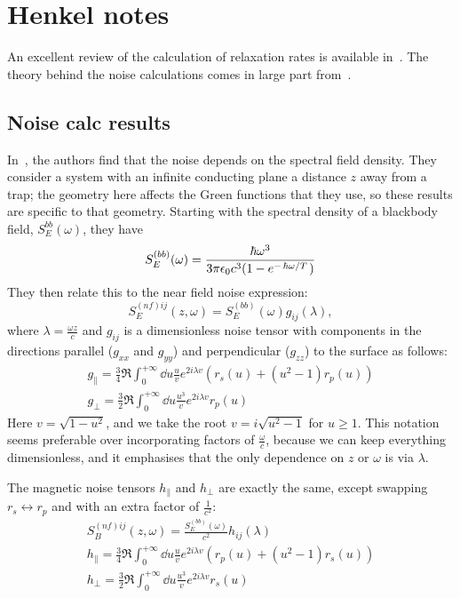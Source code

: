 \documentclass[11pt]{article}
\begin{document}

	\section{Henkel notes} \label{sec:NoiseCalc}
	An excellent review of the calculation of relaxation rates is available in~\cite{Henkel1999}.
	The theory behind the noise calculations comes in large part from~\cite{Agarwal1975}.

	\subsection{Noise calc results} \label{subsec:NoiseCalcResults}
	In~\cite{Henkel1999}, the authors find that the noise depends on the spectral field density.
	They consider a system with an infinite conducting plane a distance $z$ away from a trap;
	the geometry here affects the Green functions that they use, so these results are specific to that geometry.
	Starting with the spectral density of a blackbody field, $S^{bb}_E(\omega)$, they have
	\begin{equation}
		S^{(bb)}_E(\omega) = \frac{\hbar \omega^3}{3 \pi \epsilon_0 c^3 (1 - e^{-\flatfrac{\hbar \omega}{T}})}
	\end{equation}
	They then relate this to the near field noise expression:
	\begin{equation}
		S^{(nf)ij}_E(z, \omega) = S^{(bb)}_E(\omega) g_{ij}(\lambda),
	\end{equation}
	where $\lambda = \frac{\omega z}{c}$ and $g_{ij}$ is a dimensionless noise tensor with components in the directions parallel ($g_{xx}$ and $g_{yy}$) and perpendicular ($g_{zz}$) to the surface as follows:
	\begin{gather}
		g_\parallel = \frac34 \Re \int_0^{+\infty} \dd{u} \frac{u}{v} e^{2i \lambda v} \left(r_s(u) + \left(u^2 - 1\right) r_p(u) \right) \\
		g_\perp = \frac32 \Re \int_0^{+\infty} \dd{u} \frac{u^3}{v} e^{2 i \lambda v} r_p(u)
	\end{gather}
	Here $v = \sqrt{1 - u^2}$, and we take the root $v = i \sqrt{u^2 - 1}$ for $u \geq 1$.
	This notation seems preferable over incorporating factors of $\frac{\omega}{c}$, because we can keep everything dimensionless, and it emphasises that the only dependence on $z$ or $\omega$ is via $\lambda$.

	The magnetic noise tensors $h_\parallel$ and $h_\perp$ are exactly the same, except swapping $r_s \leftrightarrow r_p$ and with an extra factor of $\frac{1}{c^2}$:
	\begin{gather}
		S^{(nf)ij}_B(z, \omega) = \frac{S^{(bb)}_E(\omega)}{c^2} h_{ij}(\lambda) \\
		h_\parallel = \frac34 \Re \int_0^{+\infty} \dd{u} \frac{u}{v} e^{2i \lambda v} \left(r_p(u) + \left(u^2 - 1\right) r_s(u) \right) \\
		h_\perp = \frac32 \Re \int_0^{+\infty} \dd{u} \frac{u^3}{v} e^{2 i \lambda v} r_s(u)
	\end{gather}
\end{document}
